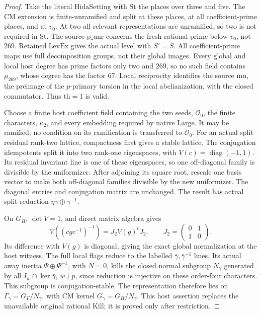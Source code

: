 \begin{proof}
Take the literal \(\mathrm{HidaSetting}\) with
\(\mathrm{St}\) the places over three and five.
The CM extension is finite-unramified and split at these
places, at all coefficient-prime places, and at \(v_0\).
At two all relevant representations are unramified, so two
is not required in \(\mathrm{St}\).  The source
\(\mathrm{p\_unr}\) concerns the fresh rational prime below
\(v_0\), not \(269\).  Retained \(\mathrm{LevEx}\) gives
the actual level with \(S'=S\).  All coefficient-prime maps
use full decomposition groups, not their global images.
Every global and local host degree has prime factors only
two and \(269\), so no such field contains \(\mu_{269}\),
whose degree has the factor \(67\).
Local reciprocity identifies the source \(\mathrm{mu}\),
the preimage of the \(p\)-primary torsion in the local
abelianization, with the closed commutator.  Thus
\(\mathrm{th}=1\) is valid.

Choose a finite host coefficient field containing the two
seeds, \(\mathcal O_0\), the finite characters, \(\kappa_2\),
and every embedding required by native \(\mathrm{Large}\).
It may be ramified; no condition on its ramification is
transferred to \(\mathcal O_0\).
For an actual split residual rank-two lattice, compactness
first gives a stable lattice.  The conjugation idempotents
split it into two rank-one eigenspaces, with
\(V(c)=\operatorname{diag}(-1,1)\).
Its residual invariant line is one of these eigenspaces,
so one off-diagonal family is divisible by the uniformizer.
After adjoining its square root, rescale one basis vector
to make both off-diagonal families divisible by the new
uniformizer.  The diagonal entries and conjugation matrix
are unchanged.  The result has actual split reduction
\(\eta\bar\gamma\oplus\bar\gamma^{-1}\).

On \(G_H\), \(\det V=1\), and direct matrix algebra gives
\[
 V((cgc^{-1})^{-1})=J_2V(g)^tJ_2,
 \qquad J_2=\begin{pmatrix}0&1\\1&0\end{pmatrix}.
 \tag{G138.28}
\]
Its difference with \(V(g)\) is diagonal, giving the exact
global normalization at the host witness.
The full local flags reduce to the labelled
\(\bar\gamma,\bar\gamma^{-1}\) lines.
Its actual away inertia \(\Psi\oplus\Psi^{-1}\), with
\(N=0\), kills the closed normal subgroup \(N_\gamma\)
generated by all \(I_w\cap\ker\bar\gamma\), \(w\nmid p\),
since reduction is injective on these order-four characters.
This subgroup is conjugation-stable.  The representation
therefore lies on \(\Gamma_\gamma=G_F/N_\gamma\), with
CM kernel \(G_\gamma=G_H/N_\gamma\).
This host assertion replaces the unavailable original
rational \(\mathrm{Kill}\); it is proved only after restriction.


\end{proof}
